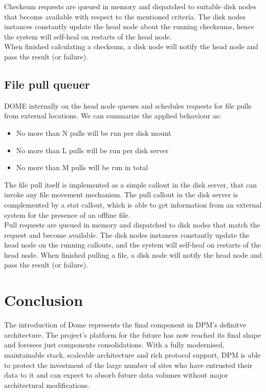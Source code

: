 \documentclass[a4paper]{jpconf}
\begin{document}
 Checksum requests are queued in memory and dispatched to suitable disk nodes that become available with respect to the mentioned criteria. The disk nodes instances
 constantly update the head node about the running checksums, hence the system will self-heal on restarts of the head node.\\
 When finished calculating a checksum, a disk node will notify the head node and pass the result (or failure).\\
 
\subsection{File pull queuer}
DOME internally on the head node queues and schedules requests for file pulls from external locations. We can summarize the applied behaviour as:
 \begin{itemize}
  \item No more than N pulls will be run per disk mount\\
  \item No more than L pulls will be run per disk server\\
  \item No more than M pulls will be run in total\\
 \end{itemize}
 
The file pull itself is implemented as a simple callout in the disk server, that can invoke any file movement mechanism.
The pull callout in the disk server is complemented by a stat callout, which is able to get information from
an external system for the presence of an offline file.\\

Pull requests are queued in memory and dispatched to disk nodes that match the request and become available.
The disk nodes instances constantly update the head node on the running callouts, and the system will self-heal
on restarts of the head node. When finished pulling a file, a disk node will notify the head node and pass the result (or failure).\\

\section{Conclusion}

The introduction of Dome represents the final component in DPM's definitve architecture. The project's
platform for the future has now reached its final shape and foresees just components consolidations.
With a fully modernised, maintainable stack, scaleable architecture
and rich protocol support, DPM is able to protect the investment of the large number of sites who have
entrusted their data to it and can expect to absorb future data volumes without major architectural modifications.
\end{document}
